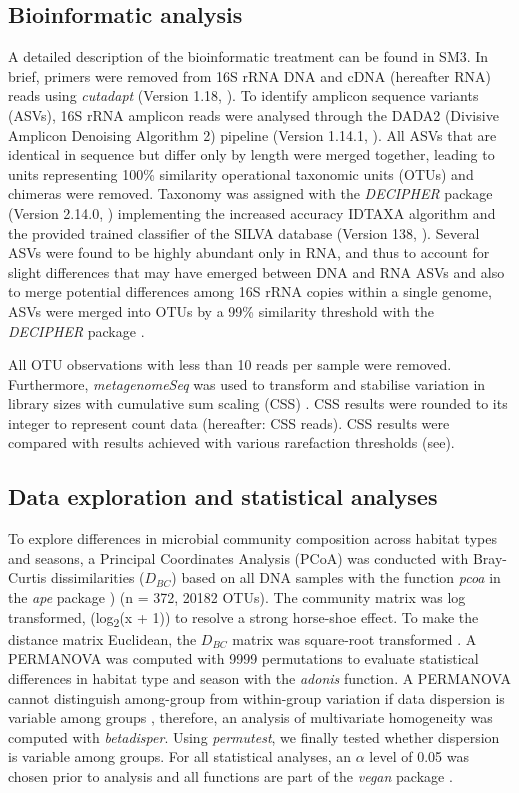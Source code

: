 \documentclass[12pt,a4paper]{article} %
\begin{document}
\subsection*{Bioinformatic analysis}
A detailed description of the bioinformatic treatment can be found in SM3. In brief, primers were removed from 16S rRNA DNA and cDNA (hereafter RNA) reads using \textit{cutadapt} (Version 1.18, \citet{Martin2013}). To identify amplicon sequence variants (ASVs), 16S rRNA amplicon reads were analysed through the DADA2 (Divisive Amplicon Denoising Algorithm 2) pipeline (Version 1.14.1, \citet{Callahan2017}). All ASVs that are identical in sequence but differ only by length were merged together, leading to units representing 100\% similarity operational taxonomic units (OTUs) and chimeras were removed. Taxonomy was assigned with the \textit{DECIPHER} package (Version 2.14.0, \citet{Wright2016}) implementing the increased accuracy IDTAXA algorithm \citep{Murali2018} and the provided trained classifier of the SILVA database (Version 138, \citet{Pruesse2007}). Several ASVs were found to be highly abundant only in RNA, and thus to account for slight differences that may have emerged between DNA and RNA ASVs and also to merge potential differences among 16S rRNA copies within a single genome, ASVs were merged into OTUs by a 99\% similarity threshold \citep{Vetrovsky2013} with the \textit{DECIPHER} package \citep{Wright2016}.

All OTU observations with less than 10 reads per sample were removed. Furthermore, \textit{metagenomeSeq} was used to transform and stabilise variation in library sizes with cumulative sum scaling (CSS) \citep{Paulson2013}. CSS results were rounded to its integer to represent count data (hereafter: CSS reads). CSS results were compared with results achieved with various rarefaction thresholds (see).

\subsection*{Data exploration and statistical analyses}
To explore differences in microbial community composition across habitat types and seasons, a Principal Coordinates Analysis (PCoA) was conducted with Bray-Curtis dissimilarities ($D_{BC}$) \citep{Bray1957, Legendre1998} based on all DNA samples with the function \textit{pcoa} in the \textit{ape} package \citep{Paradis2018}) (n = 372, 20182 OTUs). The community matrix was log transformed, (log\textsubscript{2}(x + 1)) to resolve a strong horse-shoe effect. To make the distance matrix Euclidean, the $D_{BC}$ matrix was square-root transformed \citep{Legendre1998, Borcard2011}. A PERMANOVA was computed with 9999 permutations to evaluate statistical differences in habitat type and season  with the \textit{adonis} function. A PERMANOVA cannot distinguish among-group from within-group variation if data dispersion is variable among groups \citep{Anderson2013}, therefore, an analysis of multivariate homogeneity was computed with \textit{betadisper}. Using \textit{permutest}, we finally tested whether dispersion is variable among groups. For all statistical analyses, an $\alpha$ level of 0.05 was chosen prior to analysis and all functions are part of the \textit{vegan} package \citep{Oksanen2017}.
\end{document}
